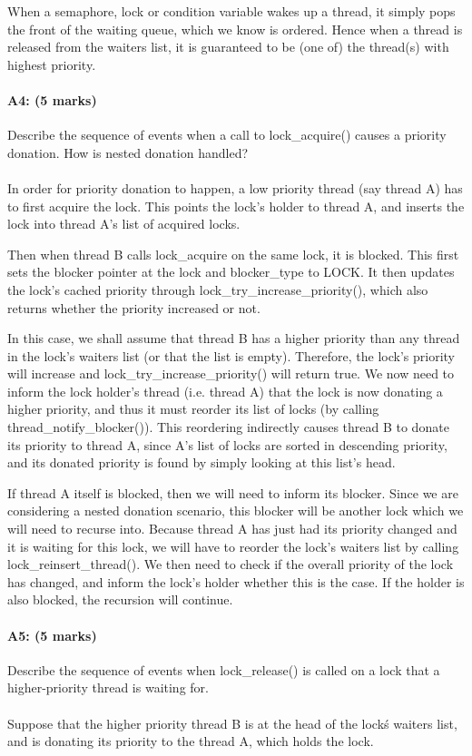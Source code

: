 When a semaphore, lock or condition variable wakes up a thread, it simply pops the front of the waiting queue, which we know is ordered. Hence when a thread is released from the waiters list, it is guaranteed to be (one of) the thread(s) with highest priority.

\paragraph{A4: (5 marks)}
Describe the sequence of events when a call to lock\_acquire() causes a priority donation.  How is nested donation handled?
\\
\\
In order for priority donation to happen, a low priority thread (say thread A) has to first acquire the lock. This points the lock's holder to thread A, and inserts the lock into thread A's list of acquired locks.

Then when thread B calls lock\_acquire on the same lock, it is blocked. This first sets the blocker pointer at the lock and blocker\_type to LOCK. It then updates the lock's cached priority through lock\_try\_increase\_priority(), which also returns whether the priority increased or not.

In this case, we shall assume that thread B has a higher priority than any thread in the lock's waiters list (or that the list is empty). Therefore, the lock's priority will increase and lock\_try\_increase\_priority() will return true. We now need to inform the lock holder's thread (i.e. thread A) that the lock is now donating a higher priority, and thus it must reorder its list of locks (by calling thread\_notify\_blocker()). This reordering indirectly causes thread B to donate its priority to thread A, since A's list of locks are sorted in descending priority, and its donated priority is found by simply looking at this list's head.

If thread A itself is blocked, then we will need to inform its blocker. Since we are considering a nested donation scenario, this blocker will be another lock which we will need to recurse into. Because thread A has just had its priority changed and it is waiting for this lock, we will have to reorder the lock's waiters list by calling lock\_reinsert\_thread(). We then need to check if the overall priority of the lock has changed, and inform the lock's holder whether this is the case. If the holder is also blocked, the recursion will continue.

\paragraph{A5: (5 marks)}
Describe the sequence of events when lock\_release() is called on a lock that a higher-priority thread is waiting for.
\\
\\
Suppose that the higher priority thread B is at the head of the lock\'s waiters list, and is donating its priority to the thread A, which holds the lock.

